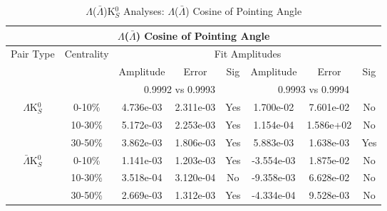 \documentclass[../AnalysisNoteJBuxton.tex]{subfiles}
\begin{document}
\begin{table}
 \centering
 \begin{tabular}{|c|c|c|c|c||c|c|c|}
  \multicolumn{8}{c}{$\Lambda$($\bar{\Lambda}$) Cosine of Pointing Angle} \\
  \hline
  \multirow{3}{*}{Pair Type} & \multirow{3}{*}{Centrality} & \multicolumn{6}{c|}{Fit Amplitudes} \\
  \cline{3-8}
   & & Amplitude & Error & Sig & Amplitude & Error & Sig \\  
  \cline{3-8}
   & & \multicolumn{3}{c||}{0.9992 vs 0.9993} & \multicolumn{3}{c|}{0.9993 vs 0.9994} \\  
  \hline  
  \multirow{3}{*}{$\Lambda$K$^{0}_{S}$}  
   &  0-10\% & 4.736e-03 & 2.311e-03 & Yes & 1.700e-02 & 7.601e-02 & No \\
   & 10-30\% & 5.172e-03 & 2.253e-03 & Yes & 1.154e-04 & 1.586e+02 & No \\
   & 30-50\% & 3.862e-03 & 1.806e-03 & Yes & 5.883e-03 & 1.638e-03 & Yes \\
  \hline  
  \multirow{3}{*}{$\bar{\Lambda}$K$^{0}_{S}$}  
   &  0-10\% & 1.141e-03 & 1.203e-03 & Yes & -3.554e-03 & 1.875e-02 & No \\
   & 10-30\% & 3.518e-04 & 3.120e-04 & No & -9.358e-03 & 6.628e-02 & No \\
   & 30-50\% & 2.669e-03 & 1.312e-03 & Yes & -4.334e-04 & 9.528e-03 & No \\
  \hline
 \end{tabular}
 \caption{$\Lambda$($\bar{\Lambda}$)K$^{0}_{S}$ Analyses: $\Lambda$($\bar{\Lambda}$) Cosine of Pointing Angle}
 \label{tab:LamCosPointingAngleLamK0}
\end{table}
\end{document}
